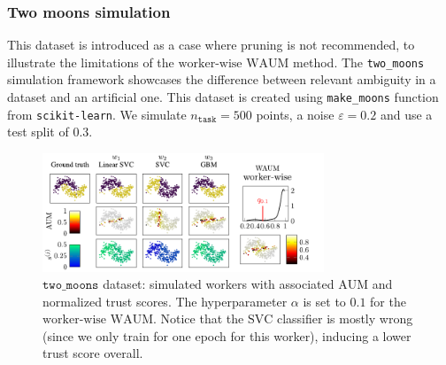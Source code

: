 \subsubsection*{Two moons simulation}

This dataset is introduced as a case where pruning is not recommended, to illustrate the limitations of the $\textrm{worker-wise WAUM}$ method.
The \texttt{two\_moons} simulation framework showcases the difference between relevant ambiguity in a dataset and an artificial one.
This dataset is created using \texttt{make\_moons} function from \texttt{scikit-learn}.
We simulate $n_\texttt{task}=500$ points, a noise $\varepsilon=0.2$ and use a test split of $0.3$.

\begin{figure}[thb]
    \centering
    \includegraphics[width=0.75\textwidth]{images/SimuMoons}
    \caption{$\texttt{two\_moons}$ dataset: simulated workers with associated $\mathrm{AUM}$ and normalized trust scores. The hyperparameter $\alpha$ is set to $0.1$ for the $\textrm{worker-wise WAUM}$.
        Notice that the $\mathrm{SVC}$ classifier is mostly wrong (since we only train for one epoch for this worker), inducing a lower trust score overall.}
    \label{fig:2moons_workers}
\end{figure}

